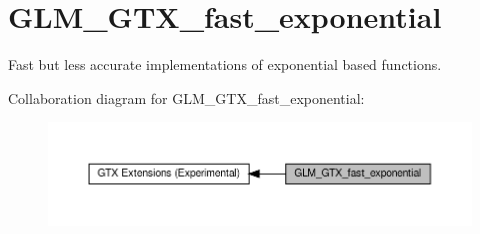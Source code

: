 \hypertarget{group__gtx__fast__exponential}{}\section{G\+L\+M\+\_\+\+G\+T\+X\+\_\+fast\+\_\+exponential}
\label{group__gtx__fast__exponential}


Fast but less accurate implementations of exponential based functions.  


Collaboration diagram for G\+L\+M\+\_\+\+G\+T\+X\+\_\+fast\+\_\+exponential\+:\nopagebreak
\begin{figure}[H]
\begin{center}
\leavevmode
\includegraphics[width=350pt]{group__gtx__fast__exponential}
\end{center}
\end{figure}
